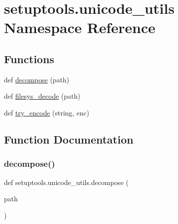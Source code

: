 \hypertarget{namespacesetuptools_1_1unicode__utils}{}\section{setuptools.\+unicode\+\_\+utils Namespace Reference}
\label{namespacesetuptools_1_1unicode__utils}
\subsection*{Functions}
\begin{DoxyCompactItemize}
\item 
def \hyperlink{namespacesetuptools_1_1unicode__utils_a0d73a9ef29c9b2362952427baf268cf9}{decompose} (path)
\item 
def \hyperlink{namespacesetuptools_1_1unicode__utils_a1b815569db9e78559bb4d6bd478e98df}{filesys\+\_\+decode} (path)
\item 
def \hyperlink{namespacesetuptools_1_1unicode__utils_aa8cee81a221e36526de668605979ef31}{try\+\_\+encode} (string, enc)
\end{DoxyCompactItemize}


\subsection{Function Documentation}
\mbox{\label{namespacesetuptools_1_1unicode__utils_a0d73a9ef29c9b2362952427baf268cf9}} 
\subsubsection{\texorpdfstring{decompose()}{decompose()}}
{\footnotesize\ttfamily def setuptools.\+unicode\+\_\+utils.\+decompose (\begin{DoxyParamCaption}\item[{}]{path }\end{DoxyParamCaption})}

\mbox{\label{namespacesetuptools_1_1unicode__utils_a1b815569db9e78559bb4d6bd478e98df}} 
